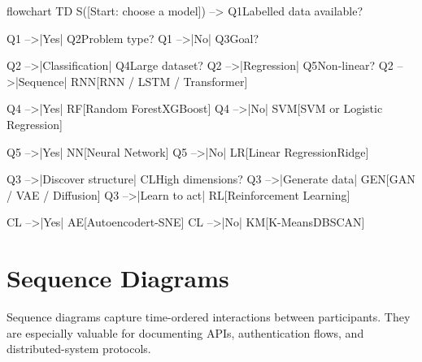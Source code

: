 \documentclass[12pt, a4paper]{article}
\begin{document}
\begin{mermaid}[
    type    = flowchart,
    theme   = forest,
    caption = {Machine learning model selection decision tree},
    label   = {fig:mlselect},
    width   = 0.88\linewidth
]
flowchart TD
    S([Start: choose a model]) --> Q1{Labelled data available?}

    Q1 -->|Yes| Q2{Problem type?}
    Q1 -->|No|  Q3{Goal?}

    Q2 -->|Classification| Q4{Large dataset?}
    Q2 -->|Regression|     Q5{Non-linear?}
    Q2 -->|Sequence|       RNN[RNN / LSTM / Transformer]

    Q4 -->|Yes| RF[Random Forest\nor XGBoost]
    Q4 -->|No|  SVM[SVM or Logistic Regression]

    Q5 -->|Yes| NN[Neural Network\nRegressor]
    Q5 -->|No|  LR[Linear Regression\nor Ridge]

    Q3 -->|Discover structure| CL{High dimensions?}
    Q3 -->|Generate data|      GEN[GAN / VAE / Diffusion]
    Q3 -->|Learn to act|       RL[Reinforcement Learning]

    CL -->|Yes| AE[Autoencoder\nor t-SNE]
    CL -->|No|  KM[K-Means\nor DBSCAN]
\end{mermaid}

\section{Sequence Diagrams}

Sequence diagrams capture time-ordered interactions between
participants. They are especially valuable for documenting APIs,
authentication flows, and distributed-system protocols.
\end{document}
